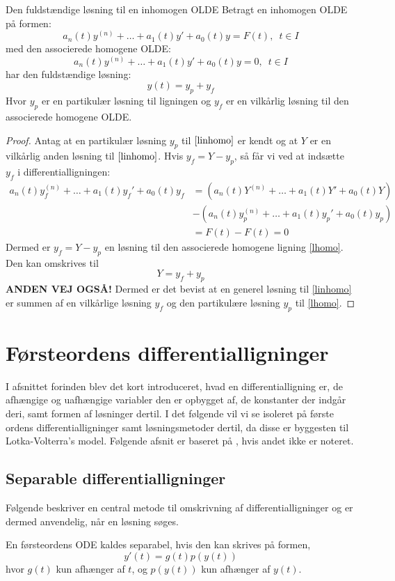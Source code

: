 \begin{mytheo}{Den fuldstændige løsning til en inhomogen OLDE}{}
Betragt en inhomogen OLDE på formen: 
\begin{equation}\label{linhomo}
a_n(t)y^{(n)}+\hdots +a_1(t)y'+a_0(t)y=F(t), \enspace t\in I
\end{equation}
med den associerede homogene OLDE:
\begin{equation}\label{lhomo}
a_n(t)y^{(n)}+\hdots +a_1(t)y'+a_0(t)y=0, \enspace t\in I
\end{equation}
har den fuldstændige løsning:
$$y(t)=y_p+y_f$$
Hvor $y_p$ er en partikulær løsning til ligningen og $y_f$ er en vilkårlig løsning til den associerede homogene OLDE.       
\end{mytheo}

\begin{proof}\hfill \break
Antag at en partikulær løsning $y_p$ til $\eqref{linhomo}$ er kendt og at $Y$ er en vilkårlig anden løsning til $\eqref{linhomo}$. Hvis $y_f=Y-y_p$, så får vi ved at indsætte $y_f$ i differentialligningen:
\begin{align*}
    a_n(t)y_f^{(n)}+\hdots +a_1(t)y_f'+a_0(t)y_f&=
    (a_n(t)Y^{(n)}+\hdots +a_1(t)Y'+a_0(t)Y)\\
    &-(a_n(t)y_p^{(n)}+\hdots +a_1(t)y_p'+a_0(t)y_p)\\
    &=F(t)-F(t)=0
\end{align*}
Dermed er $y_f=Y-y_p$ en løsning til den associerede homogene ligning \eqref{lhomo}. Den kan omskrives til
$$Y=y_f+y_p$$
\textbf{ANDEN VEJ OGSÅ!}
Dermed er det bevist at en generel løsning til \eqref{linhomo} er summen af en vilkårlige løsning $y_f$ og den partikulære løsning $y_p$ til \eqref{lhomo}.
\end{proof}

\section{Førsteordens differentialligninger}
I afsnittet forinden blev det kort introduceret, hvad en differentialligning er, de afhængige og uafhængige variabler den er opbygget af, de konstanter der indgår deri, samt formen af løsninger dertil. I det følgende vil vi se isoleret på første ordens differentialligninger samt løsningsmetoder dertil, da disse er byggesten til Lotka-Volterra's model.
Følgende afsnit er baseret på \citep{JAB}, hvis andet ikke er noteret.
\subsection{Separable differentialligninger}
Følgende beskriver en central metode til omskrivning af differentialligninger og er dermed anvendelig, når en løsning søges.
\begin{definition}
En førsteordens ODE kaldes separabel, hvis den kan skrives på formen, $$y'(t)=g(t)p(y(t))$$ hvor $g(t)$ kun afhænger af $t$, og $p(y(t))$ kun afhænger af $y(t)$.
\end{definition}

